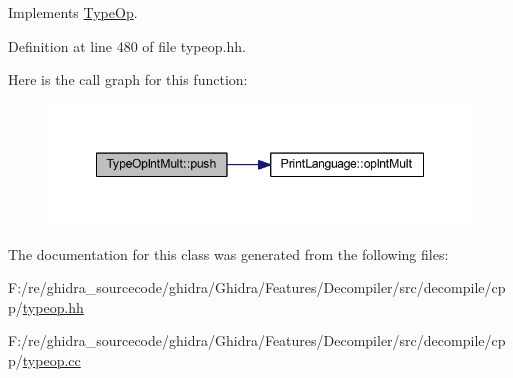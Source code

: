 Implements \mbox{\hyperlink{class_type_op_ac9c9544203ed74dabe6ac662b653b2af}{Type\+Op}}.



Definition at line 480 of file typeop.\+hh.

Here is the call graph for this function\+:
\nopagebreak
\begin{figure}[H]
\begin{center}
\leavevmode
\includegraphics[width=348pt]{class_type_op_int_mult_ab24769881d82e5db9d0ad5f91975cd4c_cgraph}
\end{center}
\end{figure}


The documentation for this class was generated from the following files\+:\begin{DoxyCompactItemize}
\item 
F\+:/re/ghidra\+\_\+sourcecode/ghidra/\+Ghidra/\+Features/\+Decompiler/src/decompile/cpp/\mbox{\hyperlink{typeop_8hh}{typeop.\+hh}}\item 
F\+:/re/ghidra\+\_\+sourcecode/ghidra/\+Ghidra/\+Features/\+Decompiler/src/decompile/cpp/\mbox{\hyperlink{typeop_8cc}{typeop.\+cc}}\end{DoxyCompactItemize}
